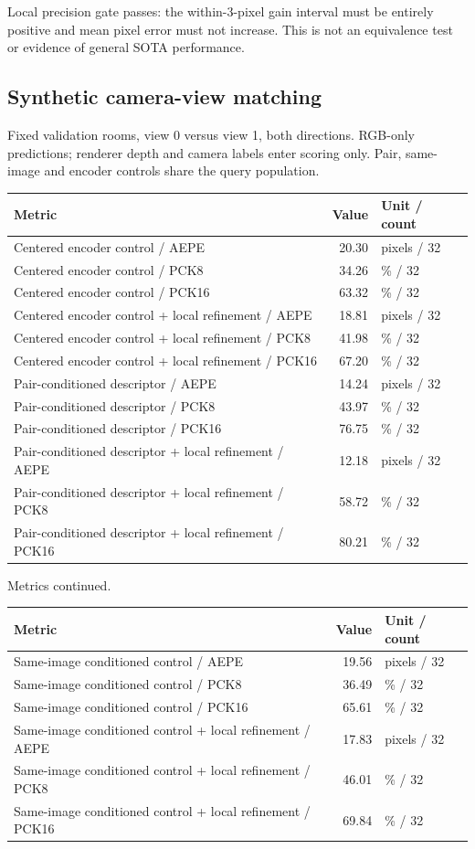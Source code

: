 \documentclass[10pt]{article}
\begin{document}
Local precision gate passes: the within-3-pixel gain interval must be entirely positive and mean pixel error must not increase. This is not an equivalence test or evidence of general SOTA performance.

\subsection{Synthetic camera-view matching}
Fixed validation rooms, view 0 versus view 1, both directions. RGB-only predictions; renderer depth and camera labels enter scoring only. Pair, same-image and encoder controls share the query population.
\begin{center}\begin{tabular}{p{.57\linewidth}rp{.23\linewidth}}\toprule Metric & Value & Unit / count \\ \midrule
Centered encoder control / AEPE & 20.30 & pixels / 32 \\
Centered encoder control / PCK8 & 34.26 & \% / 32 \\
Centered encoder control / PCK16 & 63.32 & \% / 32 \\
Centered encoder control + local refinement / AEPE & 18.81 & pixels / 32 \\
Centered encoder control + local refinement / PCK8 & 41.98 & \% / 32 \\
Centered encoder control + local refinement / PCK16 & 67.20 & \% / 32 \\
Pair-conditioned descriptor / AEPE & 14.24 & pixels / 32 \\
Pair-conditioned descriptor / PCK8 & 43.97 & \% / 32 \\
Pair-conditioned descriptor / PCK16 & 76.75 & \% / 32 \\
Pair-conditioned descriptor + local refinement / AEPE & 12.18 & pixels / 32 \\
Pair-conditioned descriptor + local refinement / PCK8 & 58.72 & \% / 32 \\
Pair-conditioned descriptor + local refinement / PCK16 & 80.21 & \% / 32 \\
\bottomrule\end{tabular}\end{center}
Metrics continued.
\begin{center}\begin{tabular}{p{.57\linewidth}rp{.23\linewidth}}\toprule Metric & Value & Unit / count \\ \midrule
Same-image conditioned control / AEPE & 19.56 & pixels / 32 \\
Same-image conditioned control / PCK8 & 36.49 & \% / 32 \\
Same-image conditioned control / PCK16 & 65.61 & \% / 32 \\
Same-image conditioned control + local refinement / AEPE & 17.83 & pixels / 32 \\
Same-image conditioned control + local refinement / PCK8 & 46.01 & \% / 32 \\
Same-image conditioned control + local refinement / PCK16 & 69.84 & \% / 32 \\
\bottomrule\end{tabular}\end{center}
\end{document}
